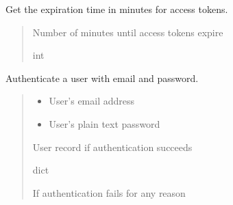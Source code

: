 \documentclass[letterpaper,10pt,openany,oneside,english]{sphinxmanual}
\begin{document}
\begin{savenotes}\begin{fulllineitems}
\label{\detokenize{modules/security:storeapi.security.access_token_expire_minutes}}
\pysigstartsignatures
{}
\pysigstopsignatures
\sphinxAtStartPar
Get the expiration time in minutes for access tokens.
\begin{quote}\begin{description}
\sphinxAtStartPar
Number of minutes until access tokens expire

\sphinxAtStartPar
int

\end{description}\end{quote}

\end{fulllineitems}\end{savenotes}


\begin{savenotes}\begin{fulllineitems}
\label{\detokenize{modules/security:storeapi.security.authenticate_user}}
\pysigstartsignatures
{}
\pysigstopsignatures
\sphinxAtStartPar
Authenticate a user with email and password.
\begin{quote}\begin{description}
\begin{itemize}
\item {} 
\sphinxAtStartPar
{} \textendash{} User’s email address

\item {} 
\sphinxAtStartPar
{} \textendash{} User’s plain text password

\end{itemize}

\sphinxAtStartPar
User record if authentication succeeds

\sphinxAtStartPar
dict

\sphinxAtStartPar
{} \textendash{} If authentication fails for any reason

\end{description}\end{quote}

\end{fulllineitems}\end{savenotes}
\end{document}
